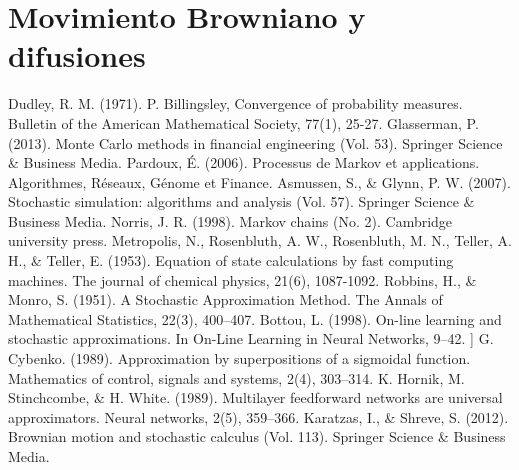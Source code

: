 \documentclass[letterpaper,11pt]{article} %
\theoremstyle{defbreak}
\theoremstyle{propbreak}
\theoremstyle{remark}
\theoremstyle{break}
\begin{document}
\newpage
\section{Movimiento Browniano y difusiones}
\label{browniano}


\newpage
\begin{references}
 Dudley, R. M. (1971). P. Billingsley, Convergence of probability measures. Bulletin of the American Mathematical Society, 77(1), 25-27.
 Glasserman, P. (2013). Monte Carlo methods in financial engineering (Vol. 53). Springer Science \& Business Media.
 Pardoux, É. (2006). Processus de Markov et applications. Algorithmes, Réseaux, Génome et Finance.
 Asmussen, S., \& Glynn, P. W. (2007). Stochastic simulation: algorithms and analysis (Vol. 57). Springer Science \& Business Media.
 Norris, J. R. (1998). Markov chains (No. 2). Cambridge university press.
 Metropolis, N., Rosenbluth, A. W., Rosenbluth, M. N., Teller, A. H., \& Teller, E. (1953). Equation of state calculations by fast computing machines. The journal of chemical physics, 21(6), 1087-1092.
 Robbins, H., \& Monro, S. (1951). A Stochastic Approximation Method. The Annals of Mathematical Statistics, 22(3), 400–407.
 Bottou, L. (1998). On-line learning and stochastic approximations. In On-Line Learning in Neural Networks, 9–42.
 ] G. Cybenko. (1989). Approximation by superpositions of a sigmoidal function. Mathematics of control, signals and systems, 2(4), 303–314.
 K. Hornik, M. Stinchcombe, \& H. White. (1989). Multilayer feedforward networks are universal approximators. Neural networks, 2(5), 359–366.
 Karatzas, I., \& Shreve, S. (2012). Brownian motion and stochastic calculus (Vol. 113). Springer Science & Business Media.
\end{references}
\end{document}
